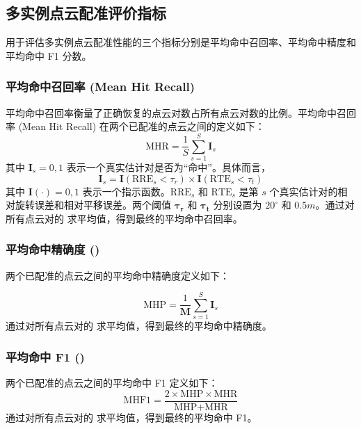 \subsection{多实例点云配准评价指标}
\label{sec:multiinstance_eval}
用于评估多实例点云配准性能的三个指标分别是平均命中召回率、平均命中精度和平均命中 F1 分数。

\subsubsection{平均命中召回率 (Mean Hit Recall)}
平均命中召回率衡量了正确恢复的点云对数占所有点云对数的比例。平均命中召回率 (Mean Hit Recall) 在两个已配准的点云之间的定义如下：
\begin{equation}
    \text{MHR} = \frac{1}{S} \sum_{s=1}^{S} \boldsymbol{I}_s
\end{equation}
其中 $\boldsymbol{I}_s = {0, 1}$ 表示一个真实估计对是否为“命中”。具体而言，
\begin{equation}
    \boldsymbol{I}_s = \boldsymbol{I}(\text{RRE}_s < \tau_r) \times \boldsymbol{I}(\text{RTE}_s < \tau_t)
\end{equation}
其中 $\boldsymbol{I}(\cdot) = {0, 1}$ 表示一个指示函数。$\text{RRE}_s$ 和 $\text{RTE}_s$ 是第 $s$ 个真实估计对的相对旋转误差和相对平移误差。两个阈值 $\boldsymbol{\tau_r}$ 和 $\boldsymbol{\tau_t}$ 分别设置为 $20^\circ$ 和 $0.5m$。通过对所有点云对的  求平均值，得到最终的平均命中召回率。

\subsubsection{平均命中精确度 ()}
两个已配准的点云之间的平均命中精确度定义如下：

\begin{equation}
\text{MHP} = \frac{1}{\boldsymbol{M}} \sum_{s=1}^{S} \boldsymbol{I}_s
\end{equation}
通过对所有点云对的  求平均值，得到最终的平均命中精确度。

\subsubsection{平均命中 F1 ()}
两个已配准的点云之间的平均命中 F1 定义如下：
\begin{equation}
\text{MHF1} = \frac{2 \times \text{MHP} \times \text{MHR}}{\text{MHP} + \text{MHR}}
\end{equation}
通过对所有点云对的  求平均值，得到最终的平均命中 F1。


